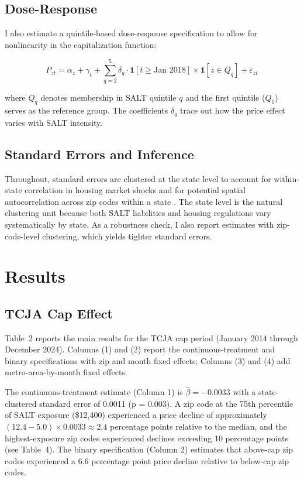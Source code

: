 \documentclass[12pt]{article}
\begin{document}
\subsection{Dose-Response}

I also estimate a quintile-based dose-response specification to allow for nonlinearity in the capitalization function:

\begin{equation}
P_{zt} = \alpha_z + \gamma_t + \sum_{q=2}^{5} \delta_q \cdot \mathbf{1}[t \geq \text{Jan 2018}] \times \mathbf{1}[z \in Q_q] + \varepsilon_{zt}
\label{eq:quintile}
\end{equation}

where $Q_q$ denotes membership in SALT quintile $q$ and the first quintile ($Q_1$) serves as the reference group. The coefficients $\delta_q$ trace out how the price effect varies with SALT intensity.

\subsection{Standard Errors and Inference}

Throughout, standard errors are clustered at the state level to account for within-state correlation in housing market shocks and for potential spatial autocorrelation across zip codes within a state \citep{BertrandDufloMullainathan2004}. The state level is the natural clustering unit because both SALT liabilities and housing regulations vary systematically by state. As a robustness check, I also report estimates with zip-code-level clustering, which yields tighter standard errors.

\section{Results}

\subsection{TCJA Cap Effect}

Table~2 reports the main results for the TCJA cap period (January 2014 through December 2024). Columns (1) and (2) report the continuous-treatment and binary specifications with zip and month fixed effects; Columns (3) and (4) add metro-area-by-month fixed effects.



The continuous-treatment estimate (Column 1) is $\hat{\beta} = -0.0033$ with a state-clustered standard error of 0.0011 (p = 0.003). A zip code at the 75th percentile of SALT exposure (\$12,400) experienced a price decline of approximately $(12.4 - 5.0) \times 0.0033 \approx 2.4$ percentage points relative to the median, and the highest-exposure zip codes experienced declines exceeding 10 percentage points (see Table~4). The binary specification (Column 2) estimates that above-cap zip codes experienced a 6.6 percentage point price decline relative to below-cap zip codes.
\end{document}
